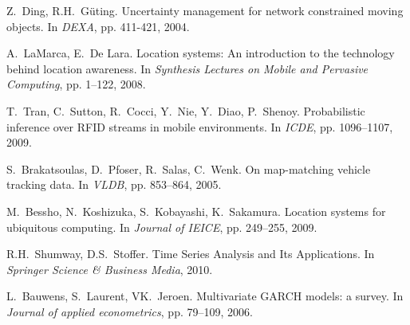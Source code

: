 \begin{frame}[allowframebreaks]
\begin{thebibliography}{99}
{
Z.~Ding, R.H.~G{\"u}ting.
\newblock Uncertainty management for network constrained moving objects.
\newblock In {\em DEXA}, pp. 411-421, 2004.

A.~LaMarca, E.~De Lara.
\newblock Location systems: An introduction to the technology behind location awareness.
\newblock In {\em Synthesis Lectures on Mobile and Pervasive Computing}, pp. 1--122, 2008.

T.~Tran, C.~Sutton, R.~Cocci, Y.~Nie, Y.~Diao, P.~Shenoy.
\newblock Probabilistic inference over RFID streams in mobile environments.
\newblock In {\em ICDE}, pp. 1096--1107, 2009.

S.~Brakatsoulas, D.~Pfoser, R.~Salas, C.~Wenk.
\newblock On map-matching vehicle tracking data.
\newblock In {\em VLDB}, pp. 853--864, 2005.

M.~Bessho, N.~Koshizuka, S.~Kobayashi, K.~Sakamura.
\newblock Location systems for ubiquitous computing.
\newblock In {\em Journal of IEICE}, pp. 249--255, 2009.

R.H.~Shumway, D.S.~Stoffer.
\newblock Time Series Analysis and Its Applications.
\newblock In {\em Springer Science \& Business Media}, 2010.

L.~Bauwens, S.~Laurent, VK.~Jeroen.
\newblock Multivariate GARCH models: a survey.
\newblock In {\em Journal of applied econometrics}, pp. 79--109, 2006.

}
\end{thebibliography}

\end{frame}
